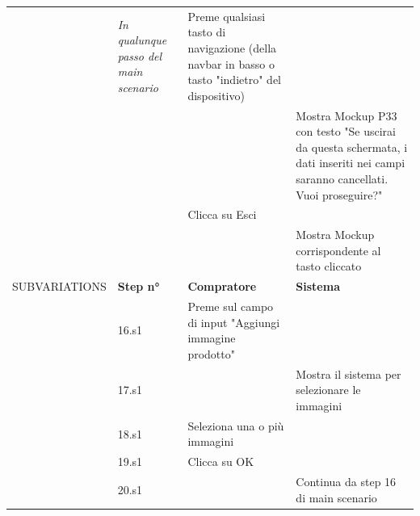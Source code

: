 \begin{longtable}{|C{3.0cm}|C{1.3cm}|L{5.2cm}|L{5.2cm}|}
                        & \textit{In qualunque passo del main scenario}
                        & Preme qualsiasi tasto di navigazione (della navbar in basso o tasto "indietro" del dispositivo)
                        & \\
                        & 
                        & 
                        & Mostra Mockup P33 con testo "Se uscirai da questa schermata, i dati inseriti nei campi saranno cancellati. Vuoi proseguire?" \\
                        & 
                        & Clicca su Esci
                        & \\
                        & 
                        & 
                        & Mostra Mockup corrispondente al tasto cliccato\\
                \hline
                    SUBVARIATIONS
                    & \textbf{Step n°} 
                    & \textbf{Compratore} 
                    & \textbf{Sistema}\\
                \hline
                        & 16.s1
                        & Preme sul campo di input "Aggiungi immagine prodotto"
                        & \\
                        & 17.s1
                        & 
                        & Mostra il sistema per selezionare le immagini\\
                        & 18.s1
                        & Seleziona una o più immagini
                        & \\
                        & 19.s1
                        & Clicca su OK
                        & \\
                        & 20.s1
                        & 
                        & Continua da step 16 di main scenario\\
                \hline
            \end{longtable}

        \newpage


